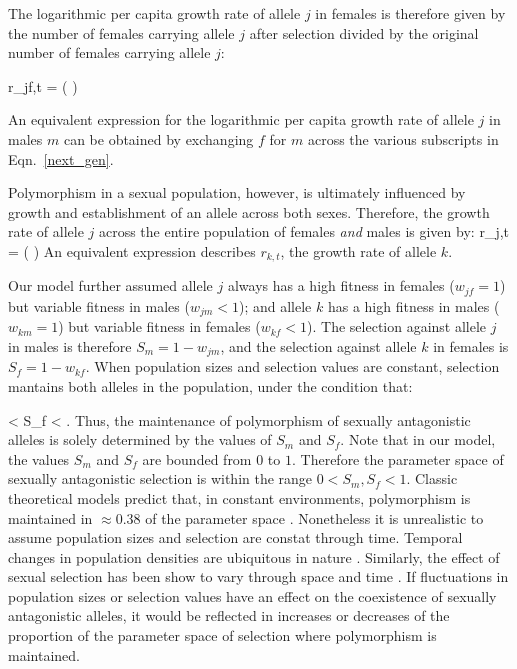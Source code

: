 \documentclass[12pt]{article}
\let\oldequation\equation
\let\oldendequation\endequation
\renewenvironment{equation}
  {\linenomathNonumbers\oldequation}
  {\oldendequation\endlinenomath}
\begin{document}
The logarithmic per capita growth rate of allele $j$ in females is therefore given by the number of females carrying allele $j$ after selection divided by the original number of females carrying allele $j$:

 \begin{equation}
     r_{jf,t} = \ln \left(  \right)
     \label{canonical}
 \end{equation}

 An equivalent expression for the logarithmic per capita growth rate of allele $j$ in males $m$ can be obtained by exchanging $f$ for $m$ across the various subscripts in Eqn.~\ref{next_gen}.

 Polymorphism in a sexual population, however, is ultimately influenced by growth and establishment of an allele across both sexes. Therefore, the growth rate of allele $j$ across the entire population of females \emph{and} males is given by:
 \begin{equation}
     r_{j,t} = \ln \left(   \right)
     \label{full}
 \end{equation}
An equivalent expression describes $r_{k,t}$, the growth rate of allele $k$.


Our model further assumed allele $j$ always has a high fitness in females ($w_{jf} = 1$) but variable fitness in males ($w_{jm} < 1$); and allele $k$ has a high fitness in males ($w_{km} = 1$)  but variable fitness in females ($w_{kf} < 1 $). The selection against allele $j$ in males is therefore $S_{m}= 1 - w_{jm}$, and the selection against allele $k$ in females is $S_{f}= 1 - w_{kf}$. When population sizes and selection values are constant,
selection mantains both alleles in the population, under the condition that:

\begin{equation}
 < S_{f} < 
\label{selection}
\end{equation}
\citep{kidwell1977regions,pamilo1979genic,patten2010fitness,connallon_evolutionary_2018}. Thus, the maintenance of polymorphism of sexually antagonistic alleles is solely determined by the values of $S_{m}$ and $S_{f}$. Note that in our model, the values $S_{m}$ and $S_{f}$ are bounded from $0$ to $1$. Therefore the parameter space of sexually antagonistic selection is within the range $ 0< S_{m}, S_{f} < 1$. Classic theoretical models predict that, in constant environments, polymorphism is maintained in $\approx 0.38$ of the parameter space \citep{kidwell1977regions,pamilo1979genic,connallon_evolutionary_2018}. Nonetheless it is unrealistic to assume population sizes and selection are constat through time. Temporal changes in population densities are ubiquitous in nature \citep{connallon2012general,reinhold2000maintenance}. Similarly, the effect of sexual selection has been show to vary through space and time \citep{kasumovic2008spatial}. If fluctuations in population sizes or selection values have an effect on the coexistence of sexually antagonistic alleles, it would be reflected in increases or decreases of the proportion of the parameter space of selection where polymorphism is maintained.
\end{document}
